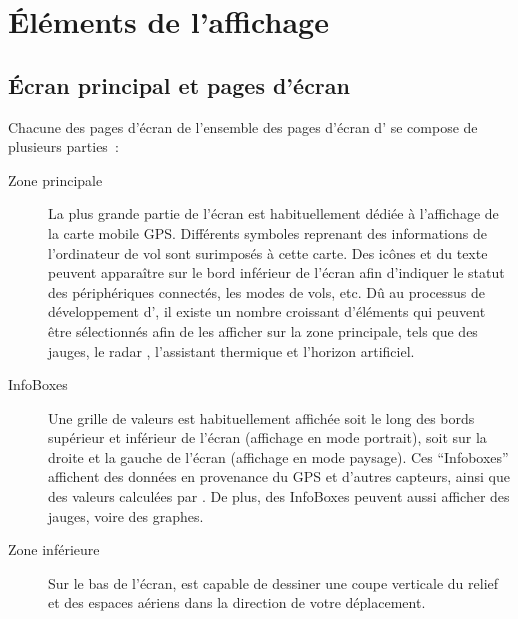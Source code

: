 \section{Éléments de l'affichage}
\subsection*{Écran principal et pages d'écran}
Chacune des pages d'écran de l'ensemble des pages d'écran d'\xc{} se compose de plusieurs
parties~:
\begin{description}
\item[Zone principale] La plus grande partie de l'écran est habituellement dédiée à l'affichage
de la carte mobile GPS. Différents symboles reprenant des informations de l'ordinateur de vol sont surimposés
à cette carte. Des icônes et du texte peuvent apparaître sur le bord inférieur de l'écran
afin d'indiquer le statut des périphériques connectés, les modes de vols, etc.
Dû au processus de développement d'\xc{}, il existe un nombre croissant
d'éléments qui peuvent être sélectionnés afin de les afficher sur la zone principale, tels que des jauges,
le radar \fl, l'assistant thermique et l'horizon artificiel.
\item[InfoBoxes] Une grille de valeurs est habituellement affichée soit le long des bords supérieur et inférieur 
de l'écran (affichage en mode portrait), soit sur la droite et la gauche de
l'écran (affichage en mode paysage). Ces ``Infoboxes'' affichent des données en provenance du
GPS et d'autres capteurs, ainsi que des valeurs calculées par \xc. De plus,
des InfoBoxes peuvent aussi afficher des jauges, voire des graphes.
\item[Zone inférieure] Sur le bas de l'écran, \xc{} est capable de dessiner une coupe
verticale du relief et des espaces aériens dans la direction de votre déplacement.
\end{description}


